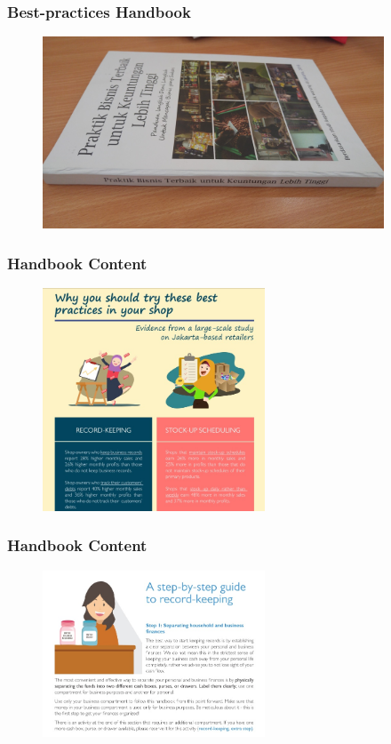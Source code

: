 \documentclass[hideothersubsections, usenames,dvipsnames,11pt]{beamer}
\begin{document}
\begin{frame}
\frametitle{Best-practices Handbook}

\begin{figure}[htbp]
	\centering
		\includegraphics[width=4in]{pics/handbook.jpg}
	
	\label{height}
\end{figure}
\end{frame}


\begin{frame}
\frametitle{Handbook Content}
\begin{figure}[htbp]
	\centering
		\includegraphics[width=2.6in]{pics/Handbook_return.jpg}
	
	\label{height}
\end{figure}
\end{frame}


\begin{frame}
\frametitle{Handbook Content}

\begin{figure}[htbp]
	\centering
		\includegraphics[width=2.6in]{pics/Handbook_stepbystep.jpg}
	
	\label{height}
\end{figure}
\end{frame}
\end{document}
